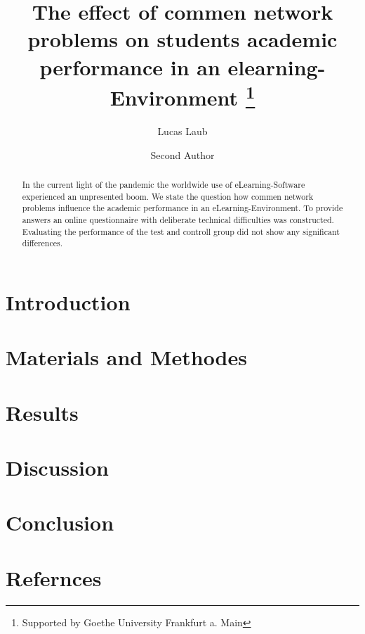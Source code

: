 \documentclass[runningheads]{llncs}
\begin{document}
\title{The effect of commen network problems on students academic performance in an elearning-Environment \thanks{Supported by Goethe University Frankfurt a. Main}}

\author{Lucas Laub \and
Second Author}


\maketitle

\begin{abstract}
In the current light of the pandemic the worldwide use
of eLearning-Software experienced an unpresented boom.
We state the question how commen network problems influence
the academic performance in an eLearning-Environment.
To provide answers an online questionnaire with deliberate
technical difficulties was constructed. Evaluating the performance
of the test and controll group did not show any significant
differences.
\end{abstract}


\section{Introduction}
\section{Materials and Methodes}
\section{Results}
\section{Discussion}
\section{Conclusion}
\section{Refernces}
\end{document}
